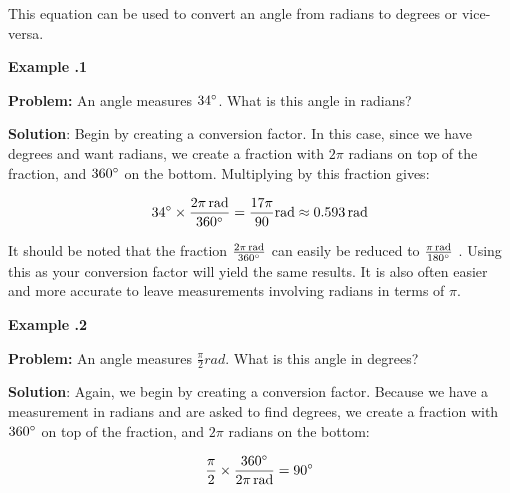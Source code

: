 This equation can be used to convert an angle from radians to degrees or vice-versa.  

 \begin{mdframed}[backgroundcolor=blue!10!white]
	\begin{center}	
		\textbf{Example \thesection.1}	
	\end{center}
	
	\textbf{Problem:} An angle measures $34 \degree$.  What is this angle in radians? 
	
	\vspace{0.2 in} 
	\textbf{Solution}: Begin by creating a conversion factor.  In this case, since we have degrees and want radians, we create a fraction with $2\pi$ radians on top of the fraction, and $360\degree$ on the bottom.  Multiplying by this fraction gives:
	
\begin{equation*}
	34 \degree \times \frac{2 \pi \, \si{rad}}{360 \degree} = \frac{17 \pi}{90}\si{rad} \approx 0.593 \, \si{rad}  
\end{equation*}
	
	It should be noted that the fraction $\frac{2 \pi \, \si{rad}}{360 \degree}$ can easily be reduced to $\frac{ \pi \, \si{rad}}{180 \degree}$ .  Using this as your conversion factor will yield the same results.  It is also often easier and more accurate to leave measurements involving radians in terms of $\pi$.  
	
\end{mdframed}
   
   
    \begin{mdframed}[backgroundcolor=blue!10!white]
   	\begin{center}	
   		\textbf{Example \thesection.2}	
   	\end{center}
   	
   	\textbf{Problem:} An angle measures $\frac{\pi}{2} \si{rad}$.  What is this angle in degrees? 
   	
   	\vspace{0.2 in} 
   	\textbf{Solution}: Again, we begin by creating a conversion factor.  Because we have a measurement in radians and are asked to find degrees, we create a fraction with $360\degree$ on top of the fraction, and  $2\pi$ radians on the bottom:
   	
   	\begin{equation*}
   		\frac{\pi}{2}  \times \frac{360 \degree}{2 \pi \, \si{rad}} = 90 \degree
   	\end{equation*}
 
   	
   \end{mdframed}

